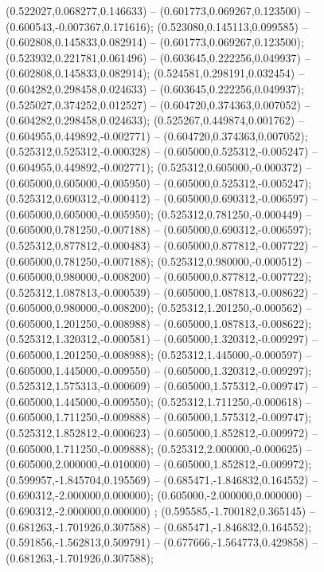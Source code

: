  (0.522027,0.068277,0.146633) -- (0.601773,0.069267,0.123500) -- (0.600543,-0.007367,0.171616);
 (0.523080,0.145113,0.099585) -- (0.602808,0.145833,0.082914) -- (0.601773,0.069267,0.123500);
 (0.523932,0.221781,0.061496) -- (0.603645,0.222256,0.049937) -- (0.602808,0.145833,0.082914);
 (0.524581,0.298191,0.032454) -- (0.604282,0.298458,0.024633) -- (0.603645,0.222256,0.049937);
 (0.525027,0.374252,0.012527) -- (0.604720,0.374363,0.007052) -- (0.604282,0.298458,0.024633);
 (0.525267,0.449874,0.001762) -- (0.604955,0.449892,-0.002771) -- (0.604720,0.374363,0.007052);
 (0.525312,0.525312,-0.000328) -- (0.605000,0.525312,-0.005247) -- (0.604955,0.449892,-0.002771);
 (0.525312,0.605000,-0.000372) -- (0.605000,0.605000,-0.005950) -- (0.605000,0.525312,-0.005247);
 (0.525312,0.690312,-0.000412) -- (0.605000,0.690312,-0.006597) -- (0.605000,0.605000,-0.005950);
 (0.525312,0.781250,-0.000449) -- (0.605000,0.781250,-0.007188) -- (0.605000,0.690312,-0.006597);
 (0.525312,0.877812,-0.000483) -- (0.605000,0.877812,-0.007722) -- (0.605000,0.781250,-0.007188);
 (0.525312,0.980000,-0.000512) -- (0.605000,0.980000,-0.008200) -- (0.605000,0.877812,-0.007722);
 (0.525312,1.087813,-0.000539) -- (0.605000,1.087813,-0.008622) -- (0.605000,0.980000,-0.008200);
 (0.525312,1.201250,-0.000562) -- (0.605000,1.201250,-0.008988) -- (0.605000,1.087813,-0.008622);
 (0.525312,1.320312,-0.000581) -- (0.605000,1.320312,-0.009297) -- (0.605000,1.201250,-0.008988);
 (0.525312,1.445000,-0.000597) -- (0.605000,1.445000,-0.009550) -- (0.605000,1.320312,-0.009297);
 (0.525312,1.575313,-0.000609) -- (0.605000,1.575312,-0.009747) -- (0.605000,1.445000,-0.009550);
 (0.525312,1.711250,-0.000618) -- (0.605000,1.711250,-0.009888) -- (0.605000,1.575312,-0.009747);
 (0.525312,1.852812,-0.000623) -- (0.605000,1.852812,-0.009972) -- (0.605000,1.711250,-0.009888);
 (0.525312,2.000000,-0.000625) -- (0.605000,2.000000,-0.010000) -- (0.605000,1.852812,-0.009972);
 (0.599957,-1.845704,0.195569) -- (0.685471,-1.846832,0.164552) -- (0.690312,-2.000000,0.000000);
 (0.605000,-2.000000,0.000000) -- (0.690312,-2.000000,0.000000) ;
 (0.595585,-1.700182,0.365145) -- (0.681263,-1.701926,0.307588) -- (0.685471,-1.846832,0.164552);
 (0.591856,-1.562813,0.509791) -- (0.677666,-1.564773,0.429858) -- (0.681263,-1.701926,0.307588);
